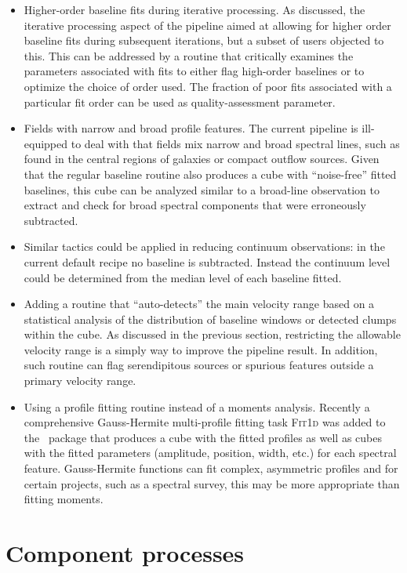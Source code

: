 \documentclass[final,authoryear,5p,times,twocolumn]{elsarticle}
\begin{document}
\begin{itemize}
\item  Higher-order baseline fits during iterative processing. As discussed, the
iterative processing aspect of the pipeline aimed at allowing for higher order
baseline fits during subsequent iterations, but a subset of users objected
to this. This can be addressed by a routine that critically examines the
parameters associated with fits to either flag high-order baselines
or to optimize the choice of order used. The fraction of poor fits associated
with a particular fit order can be used as quality-assessment parameter.
\item Fields with narrow and broad profile features.  The current pipeline
is ill-equipped to deal with that fields mix narrow and broad spectral
lines, such as found in the central regions of galaxies or compact
outflow sources. Given that the regular baseline routine also produces a
cube with ``noise-free'' fitted baselines, this cube can be analyzed similar to a
broad-line observation to extract and check for broad
spectral components that were erroneously subtracted.
\item Similar tactics could be applied in reducing continuum observations:
in the current default recipe no baseline is subtracted. Instead the continuum
level could be determined from the median level of each baseline fitted.
\item Adding a routine that ``auto-detects'' the main velocity range based
on a statistical analysis of the distribution of baseline windows or detected clumps
within the cube. As discussed in the previous section, restricting the allowable
velocity range is a simply way to improve the pipeline result. In addition,
such routine can flag serendipitous sources or spurious features outside
a primary velocity range.
\item Using a profile fitting routine instead of a moments analysis. Recently a
comprehensive Gauss-Hermite multi-profile fitting task \textsc{Fit{\footnotesize{1}}d}
was added to the \smurf\ package that produces a cube with the fitted profiles as well
as cubes with the fitted parameters (amplitude, position, width, etc.) for
each spectral feature. Gauss-Hermite functions can fit complex, asymmetric
profiles and for certain projects, such as a spectral survey, this may be more
appropriate than fitting moments.
\end{itemize}

\section{Component processes}
\end{document}
